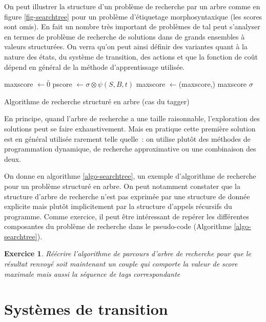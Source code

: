 \documentclass[11pt,openany]{book}
\newtheorem{exo}{Exercice}[chapter]
\newcommand{\ac}[1]{{\sc #1}} %
\begin{document}
On peut illustrer la  structure d'un problème de recherche par un arbre comme en figure \ref{fig-searchtree} pour un problème d'étiquetage morphosyntaxique (les scores sont omis). En fait un nombre très important de problèmes de \ac{tal} peut s'analyser en termes de problème de recherche de solutions dans de grands ensembles à valeurs structurées. On verra qu'on peut ainsi définir des variantes quant à la nature des états, du système de transition, des actions et que la fonction de coût dépend en général de la méthode d'apprentissage utilisée. 
\begin{algorithm}[htbp]
\begin{algorithmic}[1]
\State maxscore $\gets \bar{0}$
	\State pscore $\gets \sigma \otimes \psi(S,B,t)$
	\State maxscore $\gets $\Call{$\oplus$}{}(maxscore,)
\EndFor
\State\Return maxscore
\Else
  \State\Return $\sigma$
\EndIf
\EndFunction
\end{algorithmic}
\caption{\label{algo-searchtree}Algorithme de recherche structuré en arbre (cas du tagger)}
\end{algorithm}
En principe, quand l'arbre de recherche a une taille raisonnable, l'exploration des solutions peut se faire exhaustivement.  Mais en pratique cette première solution est en général utilisée rarement telle quelle~: on utilise plutôt des méthodes de programmation dynamique, de recherche approximative ou une combinaison des deux.

On  donne en algorithme \ref{algo-searchtree},
un exemple d'algorithme de recherche pour un problème structuré en arbre. On peut notamment constater que la structure d'arbre de recherche n'est pas exprimée par une structure de donnée explicite mais plutôt implicitement par la structure d'appels récursifs du programme. Comme exercice, il peut être intéressant de repérer les différentes composantes du problème de recherche dans le pseudo-code  (Algorithme \ref{algo-searchtree}).



\begin{exo}Réécrire l'algorithme de parcours d'arbre de recherche
pour que le résultat renvoyé soit maintenant un couple qui comporte la valeur de score maximale mais aussi la séquence de tags correspondante
\end{exo}






\section{Systèmes de transition}
\end{document}
